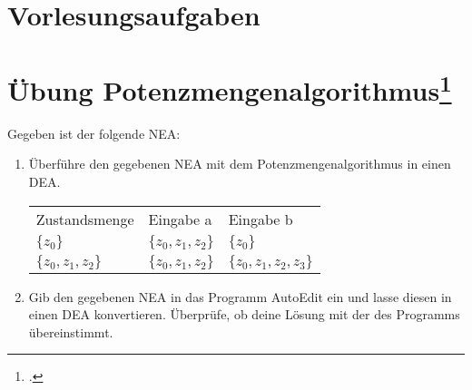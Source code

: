 \documentclass{lehramt-informatik-aufgabe}
\begin{document}
\section{Vorlesungsaufgaben
}

\section{Übung Potenzmengenalgorithmus\footcite[Seite 46]{theoinf:fs:1}}

Gegeben ist der folgende NEA:

\begin{center}
\end{center}

\begin{enumerate}
\item Überführe den gegebenen NEA mit dem Potenzmengenalgorithmus in
einen DEA.

\begin{liAntwort}
\begin{tabular}{lll}
Zustandsmenge & Eingabe a & Eingabe b \\
$\{ z_0 \}$ & $\{ z_0, z_1, z_2 \}$ & $\{ z_0 \}$ \\
$\{ z_0, z_1, z_2 \}$ & $\{ z_0, z_1, z_2 \}$ & $\{ z_0, z_1, z_2, z_3 \}$ \\
\end{tabular}

\begin{center}
\end{center}
\end{liAntwort}

\item Gib den gegebenen NEA in das Programm AutoEdit ein und lasse
diesen in einen DEA konvertieren. Überprüfe, ob deine Lösung mit der des
Programms übereinstimmt.
\end{enumerate}
\end{document}

